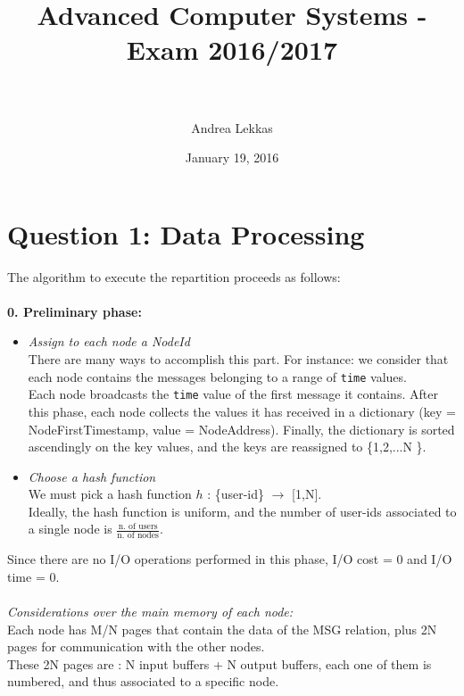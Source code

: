 \documentclass[paper=a4, fontsize=11pt]{scrartcl} %
\title{	
	\textsf{\huge Advanced Computer Systems - Exam 2016/2017 \\} %
	\horrule{0.5pt} \\[0.4cm] %
}
\author {\normalsize Andrea Lekkas} %
\date{\normalsize January 19, 2016 } %
\numberwithin{equation}{section} %
\numberwithin{figure}{section} %
\numberwithin{table}{section} %
\begin{document}
\maketitle %


\setcounter{secnumdepth}{0}

\section{Question 1: Data Processing}
The algorithm to execute the repartition proceeds as follows:\\
~\\
\textbf{0. Preliminary phase:} 
\begin{itemize}
\item \textit{Assign to each node a NodeId}\\
There are many ways to accomplish this part. For instance: we consider that each node contains the messages belonging to a range of \verb|time| values. \\
Each node broadcasts the \verb|time| value of the first message it contains. After this phase, each node collects the values it has received in a dictionary (key = NodeFirstTimestamp, value = NodeAddress). Finally, the dictionary is sorted ascendingly on the key values, and the keys are reassigned to \{1,2,...N \}.\\
\item \textit{Choose a hash function}\\
We must pick a hash function $h$ : \{user-id\} $ \rightarrow $ [1,N].\\
Ideally, the hash function is uniform, and the number of user-ids associated to a single node is $ \frac{\text{n. of users}}{\text{n. of nodes}}$.\\
\end{itemize}
Since there are no I/O operations performed in this phase, I/O cost = 0  and  I/O time = 0.\\~\\
\textit{Considerations over the main memory of each node:}\\
Each node has M/N pages that contain the data of the MSG relation, plus 2N pages for communication with the other nodes.\\
These 2N pages are : N input buffers + N output buffers, each one of them is numbered, and thus associated to a specific node.\\
~\\
\end{document}

